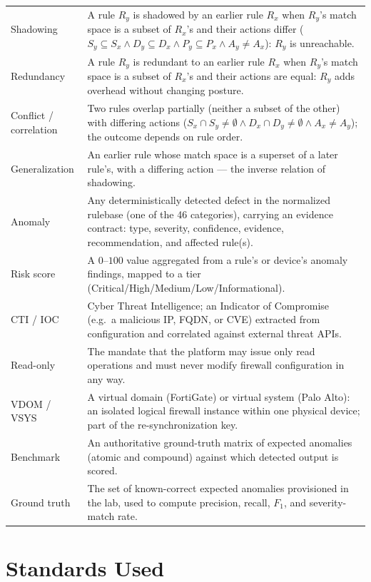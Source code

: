 \documentclass[12pt,a4paper]{report}
\renewcommand{\_}{\textunderscore\allowbreak}
\begin{document}
\begin{longtable}{L{0.24\textwidth} L{0.70\textwidth}}
Shadowing & A rule $R_y$ is shadowed by an earlier rule $R_x$ when $R_y$'s match space is a subset of $R_x$'s and their actions differ ($S_y\subseteq S_x \wedge D_y\subseteq D_x \wedge P_y\subseteq P_x \wedge A_y\neq A_x$): $R_y$ is unreachable. \\
Redundancy & A rule $R_y$ is redundant to an earlier rule $R_x$ when $R_y$'s match space is a subset of $R_x$'s and their actions are equal: $R_y$ adds overhead without changing posture. \\
Conflict / correlation & Two rules overlap partially (neither a subset of the other) with differing actions ($S_x\cap S_y\neq\emptyset \wedge D_x\cap D_y\neq\emptyset \wedge A_x\neq A_y$); the outcome depends on rule order. \\
Generalization & An earlier rule whose match space is a superset of a later rule's, with a differing action --- the inverse relation of shadowing. \\
Anomaly & Any deterministically detected defect in the normalized rulebase (one of the 46 categories), carrying an evidence contract: type, severity, confidence, evidence, recommendation, and affected rule(s). \\
Risk score & A $0$--$100$ value aggregated from a rule's or device's anomaly findings, mapped to a tier (Critical/High/Medium/Low/Informational). \\
CTI / IOC & Cyber Threat Intelligence; an Indicator of Compromise (e.g.\ a malicious IP, FQDN, or CVE) extracted from configuration and correlated against external threat APIs. \\
Read-only & The mandate that the platform may issue only read operations and must never modify firewall configuration in any way. \\
VDOM / VSYS & A virtual domain (FortiGate) or virtual system (Palo Alto): an isolated logical firewall instance within one physical device; part of the re-synchronization key. \\
Benchmark & An authoritative ground-truth matrix of expected anomalies (atomic and compound) against which detected output is scored. \\
Ground truth & The set of known-correct expected anomalies provisioned in the lab, used to compute precision, recall, $F_1$, and severity-match rate. \\ \hline
\end{longtable}

\section{Standards Used}
\label{sec:ch1-standards}
\end{document}
